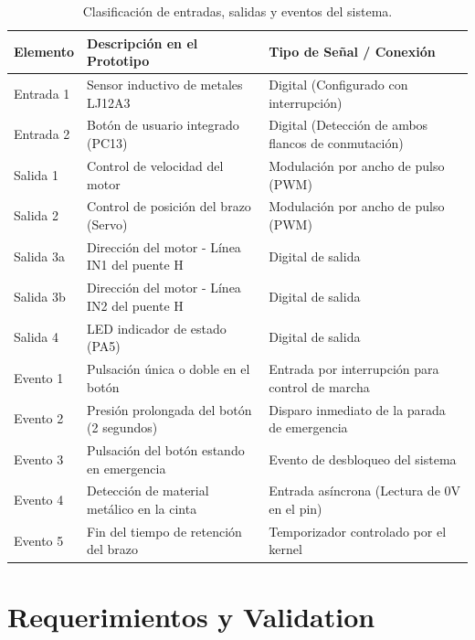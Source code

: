 \documentclass[12pt, letterpaper]{article}
\begin{document}
\begin{table}[H]
\centering
\small
\renewcommand{\arraystretch}{1.1}
\caption{Clasificación de entradas, salidas y eventos del sistema.}
\label{tab:entradas_salidas_eventos}
\vspace{0.3cm}
\begin{tabularx}{\textwidth}{lXX}
\toprule
\textbf{Elemento} & \textbf{Descripción en el Prototipo} & \textbf{Tipo de Señal / Conexión} \\
\midrule
Entrada 1         & Sensor inductivo de metales LJ12A3 & Digital (Configurado con interrupción) \\
Entrada 2         & Botón de usuario integrado (PC13) & Digital (Detección de ambos flancos de conmutación) \\
\midrule
Salida 1          & Control de velocidad del motor & Modulación por ancho de pulso (PWM) \\
Salida 2          & Control de posición del brazo (Servo) & Modulación por ancho de pulso (PWM) \\
Salida 3a         & Dirección del motor - Línea IN1 del puente H & Digital de salida \\
Salida 3b         & Dirección del motor - Línea IN2 del puente H & Digital de salida \\
Salida 4          & LED indicador de estado (PA5) & Digital de salida \\
\midrule
Evento 1          & Pulsación única o doble en el botón & Entrada por interrupción para control de marcha \\
Evento 2          & Presión prolongada del botón (2 segundos) & Disparo inmediato de la parada de emergencia \\
Evento 3          & Pulsación del botón estando en emergencia & Evento de desbloqueo del sistema \\
Evento 4          & Detección de material metálico en la cinta & Entrada asíncrona (Lectura de 0V en el pin) \\
Evento 5          & Fin del tiempo de retención del brazo & Temporizador controlado por el kernel \\
\bottomrule
\end{tabularx}
\end{table}

\section{Requerimientos y Validation}
\label{sec:requerimientos_preliminares}
\end{document}
